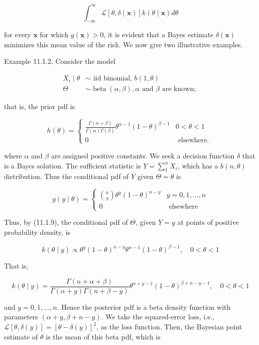 $$
\int_{-\infty}^{\infty} \mathcal{L}[\theta, \delta(\mathbf{x})] k(\theta \mid \mathbf{x}) d \theta
$$

for every $\mathbf{x}$ for which $g(\mathbf{x})>0$, it is evident that a Bayes estimate $\delta(\mathbf{x})$ minimizes this mean value of the risk. We now give two illustrative examples.

Example 11.1.2. Consider the model

$$
\begin{aligned}
X_{i} \mid \theta & \sim \text { iid binomial, } b(1, \theta) \\
\Theta & \sim \operatorname{beta}(\alpha, \beta), \alpha \text { and } \beta \text { are known; }
\end{aligned}
$$

that is, the prior pdf is

$$
h(\theta)= \begin{cases}\frac{\Gamma(\alpha+\beta)}{\Gamma(\alpha) \Gamma(\beta)} \theta^{\alpha-1}(1-\theta)^{\beta-1} & 0<\theta<1 \\ 0 & \text { elsewhere. }\end{cases}
$$

where $\alpha$ and $\beta$ are assigned positive constants. We seek a decision function $\delta$ that is a Bayes solution. The sufficient statistic is $Y=\sum_{1}^{n} X_{i}$, which has a $b(n, \theta)$ distribution. Thus the conditional pdf of $Y$ given $\Theta=\theta$ is

$$
g(y \mid \theta)= \begin{cases}\binom{n}{y} \theta^{y}(1-\theta)^{n-y} & y=0,1, \ldots, n \\ 0 & \text { elsewhere }\end{cases}
$$

Thus, by (11.1.9), the conditional pdf of $\Theta$, given $Y=y$ at points of positive probability density, is

$$
k(\theta \mid y) \propto \theta^{y}(1-\theta)^{n-y} \theta^{\alpha-1}(1-\theta)^{\beta-1}, \quad 0<\theta<1
$$

That is,

$$
k(\theta \mid y)=\frac{\Gamma(n+\alpha+\beta)}{\Gamma(\alpha+y) \Gamma(n+\beta-y)} \theta^{\alpha+y-1}(1-\theta)^{\beta+n-y-1}, \quad 0<\theta<1
$$

and $y=0,1, \ldots, n$. Hence the posterior pdf is a beta density function with parameters $(\alpha+y, \beta+n-y)$. We take the squared-error loss, i.e., $\mathcal{L}[\theta, \delta(y)]=[\theta-\delta(y)]^{2}$, as the loss function. Then, the Bayesian point estimate of $\theta$ is the mean of this beta pdf, which is

